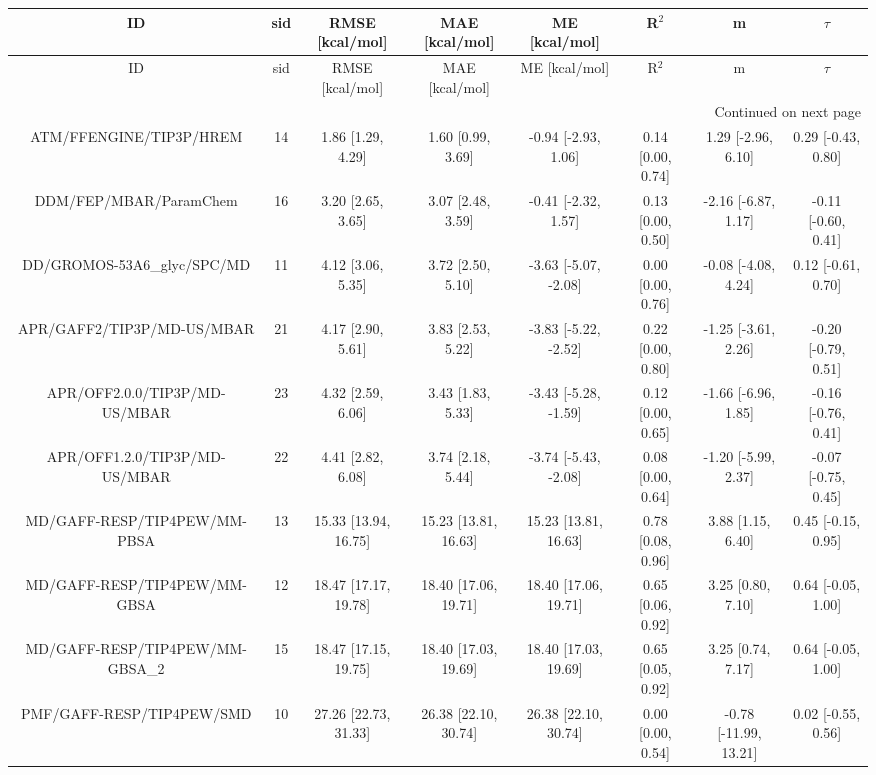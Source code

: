 \documentclass[8pt]{article}
\begin{document}
\begin{center}
\begin{footnotesize}
\begin{longtable}{|cccccccc|}
\toprule
                             ID & sid &      RMSE [kcal/mol] &       MAE [kcal/mol] &        ME [kcal/mol] &             R$^2$ &                     m &              $\tau$ \\
\midrule
\endfirsthead

\toprule
                             ID & sid &      RMSE [kcal/mol] &       MAE [kcal/mol] &        ME [kcal/mol] &             R$^2$ &                     m &              $\tau$ \\
\midrule
\endhead
\midrule
\multicolumn{8}{r}{{Continued on next page}} \\
\midrule
\endfoot

\bottomrule
\endlastfoot
        ATM/FFENGINE/TIP3P/HREM &  14 &    1.86 [1.29, 4.29] &    1.60 [0.99, 3.69] &  -0.94 [-2.93, 1.06] & 0.14 [0.00, 0.74] &    1.29 [-2.96, 6.10] &  0.29 [-0.43, 0.80] \\
         DDM/FEP/MBAR/ParamChem &  16 &    3.20 [2.65, 3.65] &    3.07 [2.48, 3.59] &  -0.41 [-2.32, 1.57] & 0.13 [0.00, 0.50] &   -2.16 [-6.87, 1.17] & -0.11 [-0.60, 0.41] \\
    DD/GROMOS-53A6\_glyc/SPC/MD &  11 &    4.12 [3.06, 5.35] &    3.72 [2.50, 5.10] & -3.63 [-5.07, -2.08] & 0.00 [0.00, 0.76] &   -0.08 [-4.08, 4.24] &  0.12 [-0.61, 0.70] \\
     APR/GAFF2/TIP3P/MD-US/MBAR &  21 &    4.17 [2.90, 5.61] &    3.83 [2.53, 5.22] & -3.83 [-5.22, -2.52] & 0.22 [0.00, 0.80] &   -1.25 [-3.61, 2.26] & -0.20 [-0.79, 0.51] \\
  APR/OFF2.0.0/TIP3P/MD-US/MBAR &  23 &    4.32 [2.59, 6.06] &    3.43 [1.83, 5.33] & -3.43 [-5.28, -1.59] & 0.12 [0.00, 0.65] &   -1.66 [-6.96, 1.85] & -0.16 [-0.76, 0.41] \\
  APR/OFF1.2.0/TIP3P/MD-US/MBAR &  22 &    4.41 [2.82, 6.08] &    3.74 [2.18, 5.44] & -3.74 [-5.43, -2.08] & 0.08 [0.00, 0.64] &   -1.20 [-5.99, 2.37] & -0.07 [-0.75, 0.45] \\
   MD/GAFF-RESP/TIP4PEW/MM-PBSA &  13 & 15.33 [13.94, 16.75] & 15.23 [13.81, 16.63] & 15.23 [13.81, 16.63] & 0.78 [0.08, 0.96] &     3.88 [1.15, 6.40] &  0.45 [-0.15, 0.95] \\
   MD/GAFF-RESP/TIP4PEW/MM-GBSA &  12 & 18.47 [17.17, 19.78] & 18.40 [17.06, 19.71] & 18.40 [17.06, 19.71] & 0.65 [0.06, 0.92] &     3.25 [0.80, 7.10] &  0.64 [-0.05, 1.00] \\
MD/GAFF-RESP/TIP4PEW/MM-GBSA\_2 &  15 & 18.47 [17.15, 19.75] & 18.40 [17.03, 19.69] & 18.40 [17.03, 19.69] & 0.65 [0.05, 0.92] &     3.25 [0.74, 7.17] &  0.64 [-0.05, 1.00] \\
      PMF/GAFF-RESP/TIP4PEW/SMD &  10 & 27.26 [22.73, 31.33] & 26.38 [22.10, 30.74] & 26.38 [22.10, 30.74] & 0.00 [0.00, 0.54] & -0.78 [-11.99, 13.21] &  0.02 [-0.55, 0.56] \\
\end{longtable}
\end{footnotesize}
\end{center}
\end{document}
